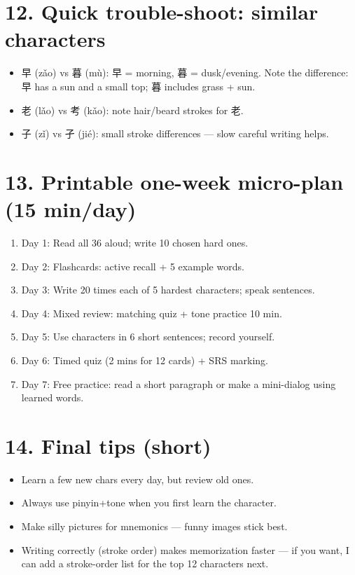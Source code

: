 \documentclass[12pt]{article}
\begin{document}
\begin{CJK}{UTF8}{gbsn}
\section*{12. Quick trouble-shoot: similar characters}
\begin{itemize}
  \item 早 (zǎo) vs 暮 (mù): 早 = morning, 暮 = dusk/evening. Note the difference: 早 has a sun and a small top; 暮 includes grass + sun.
  \item 老 (lǎo) vs 考 (kǎo): note hair/beard strokes for 老.
  \item 子 (zǐ) vs 孑 (jié): small stroke differences — slow careful writing helps.
\end{itemize}

\section*{13. Printable one-week micro-plan (15 min/day)}
\begin{enumerate}
  \item Day 1: Read all 36 aloud; write 10 chosen hard ones.
  \item Day 2: Flashcards: active recall + 5 example words.
  \item Day 3: Write 20 times each of 5 hardest characters; speak sentences.
  \item Day 4: Mixed review: matching quiz + tone practice 10 min.
  \item Day 5: Use characters in 6 short sentences; record yourself.
  \item Day 6: Timed quiz (2 mins for 12 cards) + SRS marking.
  \item Day 7: Free practice: read a short paragraph or make a mini-dialog using learned words.
\end{enumerate}

\section*{14. Final tips (short)}
\begin{itemize}
  \item Learn a few new chars every day, but review old ones. \\
  \item Always use pinyin+tone when you first learn the character. \\
  \item Make silly pictures for mnemonics — funny images stick best. \\
  \item Writing correctly (stroke order) makes memorization faster — if you want, I can add a stroke-order list for the top 12 characters next.
\end{itemize}


\end{CJK}
\end{document}
